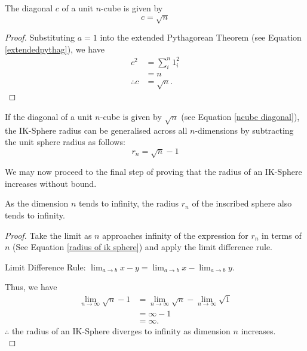 \begin{corollary} The diagonal $c$ of a unit $n$-cube is given by
\begin{equation} \label{ncube diagonal}
    c = \sqrt{n}
\end{equation}
\end{corollary}
\begin{proof}
    Substituting $a=1$ into the extended Pythagorean Theorem (see Equation \ref{extendedpythag}), we have
    \begin{align*}
        c^2 &= \sum_{i}^{n}1_i^2\\
        &=n\\
        \therefore c &= \sqrt{n}.
    \end{align*}
\end{proof}

If the diagonal of a unit $n$-cube is given by $\sqrt{n}$ (see Equation \ref{ncube diagonal}), the IK-Sphere radius can be generalised across all $n$-dimensions by subtracting the unit sphere radius as follows:
\begin{equation}\label{radius of ik sphere}
    r_n = \sqrt{n}-1
\end{equation}

\noindent
We may now proceed to the final step of proving that the radius of an IK-Sphere increases without bound.

\begin{theorem}
As the dimension $n$ tends to infinity, the radius $r_n$ of the inscribed sphere also tends to infinity.
\end{theorem}
\begin{proof}
Take the limit as $n$ approaches infinity of the expression for $r_n$ in terms of $n$ (See Equation \ref{radius of ik sphere}) and apply the limit difference rule. 

\noindent
Limit Difference Rule: $\lim_{a\to b} x-y =  \lim_{a\to b}x - \lim_{a\to b}y$.

\noindent
Thus, we have
\begin{align*}
    \lim_{n\to\infty} \sqrt{n}-1 &= \lim_{n\to\infty} \sqrt{n} - \lim_{n\to\infty} \sqrt{1}\\
    &=\infty - 1\\
    &=\infty.
\end{align*}
$\therefore$ the radius of an IK-Sphere diverges to infinity as dimension $n$ increases.\\
\end{proof}

